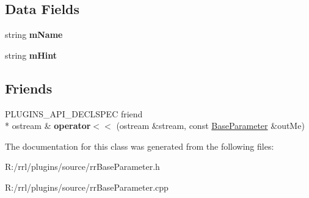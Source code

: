 \subsection*{Data Fields}
\begin{DoxyCompactItemize}
\item 
\hypertarget{classrrp_1_1_base_parameter_a1e458281effaffe16418036bea0ca965}{string {\bfseries m\-Name}}\label{classrrp_1_1_base_parameter_a1e458281effaffe16418036bea0ca965}

\item 
\hypertarget{classrrp_1_1_base_parameter_af3e85459dd4bac34f3c32de2aaa8c1c9}{string {\bfseries m\-Hint}}\label{classrrp_1_1_base_parameter_af3e85459dd4bac34f3c32de2aaa8c1c9}

\end{DoxyCompactItemize}
\subsection*{Friends}
\begin{DoxyCompactItemize}
\item 
\hypertarget{classrrp_1_1_base_parameter_ac08e7db0c80e04461877ea1a2967e4ab}{P\-L\-U\-G\-I\-N\-S\-\_\-\-A\-P\-I\-\_\-\-D\-E\-C\-L\-S\-P\-E\-C friend \\*
ostream \& {\bfseries operator$<$$<$} (ostream \&stream, const \hyperlink{classrrp_1_1_base_parameter}{Base\-Parameter} \&out\-Me)}\label{classrrp_1_1_base_parameter_ac08e7db0c80e04461877ea1a2967e4ab}

\end{DoxyCompactItemize}


The documentation for this class was generated from the following files\-:\begin{DoxyCompactItemize}
\item 
R\-:/rrl/plugins/source/rr\-Base\-Parameter.\-h\item 
R\-:/rrl/plugins/source/rr\-Base\-Parameter.\-cpp\end{DoxyCompactItemize}
